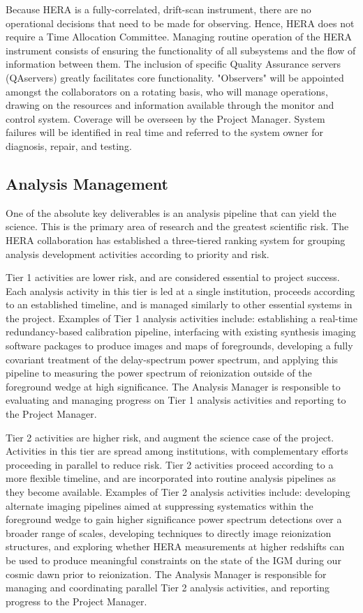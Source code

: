 \documentclass[preprint]{aastex}
\begin{document}
Because HERA is a fully-correlated, drift-scan instrument, there are no operational
decisions that need to be made for observing. Hence, HERA does not require a Time
Allocation Committee. Managing routine operation of the HERA instrument consists of
ensuring the functionality of all subsystems and the flow of information between
them. The inclusion of specific Quality Assurance servers (QAservers) greatly
facilitates core functionality. "Observers" will be appointed amongst the
collaborators on a rotating basis, who will manage operations, drawing on the
resources and information available through the monitor and control system. Coverage
will be overseen by the Project Manager. System failures will be identified in real
time and referred to the system owner for diagnosis, repair, and testing.


\subsection{Analysis Management}
\label{sec:analysis}

One of the absolute key deliverables is an analysis pipeline that can yield the science.  This is the primary area of
research and the greatest scientific risk.  The HERA collaboration has established
a three-tiered ranking system for grouping analysis development activities according to priority and risk.

Tier 1 activities are lower risk, and are considered essential to project success.  Each analysis activity
in this tier is led at a single institution, proceeds according to an established timeline, and is managed
similarly to other essential systems in the project.  Examples of Tier 1 analysis activities include:
establishing a real-time redundancy-based calibration pipeline, interfacing with existing synthesis imaging
software packages to produce images and maps of foregrounds, developing a fully covariant treatment of
the delay-spectrum power spectrum, and applying this pipeline to measuring the power spectrum of reionization
outside of the foreground wedge at high significance.
The Analysis Manager is responsible to evaluating
and managing progress on Tier 1 analysis activities and reporting to the Project Manager.

Tier 2 activities are higher risk, and augment the science case of the project.  Activities in
this tier are spread among institutions, with complementary efforts proceeding in parallel to
reduce risk.  Tier 2 activities proceed according to a more flexible timeline, and are incorporated
into routine analysis pipelines as they become available.  Examples of Tier 2 analysis activities
include:
developing alternate imaging pipelines aimed at suppressing systematics within the foreground wedge
to gain higher significance power spectrum detections over a broader range of scales, developing
techniques to directly image reionization structures, and exploring whether HERA measurements at
higher redshifts can be used to produce meaningful constraints on the state of the IGM during
our cosmic dawn prior to reionization.  The Analysis Manager is responsible for managing and coordinating
parallel Tier 2 analysis activities, and reporting progress to the Project Manager.
\end{document}
